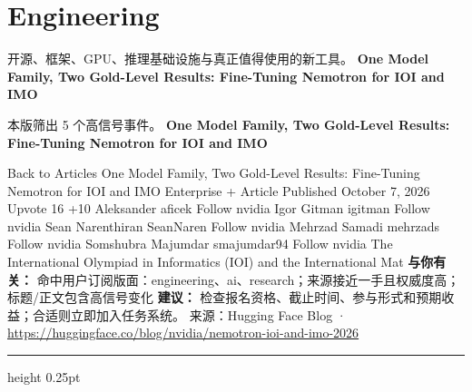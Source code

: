 \documentclass[10.5pt]{ctexart}
\begin{document}
\section*{Engineering}
{\color{ormuted} 开源、框架、GPU、推理基础设施与真正值得使用的新工具。}
\vspace{2mm}
{\LARGE\bfseries One Model Family, Two Gold-Level Results: Fine-Tuning Nemotron for IOI and IMO}\par
\vspace{1mm}
{\color{ormuted} 本版筛出 5 个高信号事件。}
\vspace{3mm}
{\Large\bfseries One Model Family, Two Gold-Level Results: Fine-Tuning Nemotron for IOI and IMO}\par
Back to Articles One Model Family, Two Gold-Level Results: Fine-Tuning Nemotron for IOI and IMO Enterprise + Article Published October 7, 2026 Upvote 16 +10 Aleksander aficek Follow nvidia Igor Gitman igitman Follow nvidia Sean Narenthiran SeanNaren Follow nvidia Mehrzad Samadi mehrzads Follow nvidia Somshubra Majumdar smajumdar94 Follow nvidia The International Olympiad in Informatics (IOI) and the International Mat
\textbf{与你有关：} 命中用户订阅版面：engineering、ai、research；来源接近一手且权威度高；标题/正文包含高信号变化
\textbf{建议：} 检查报名资格、截止时间、参与形式和预期收益；合适则立即加入任务系统。
{\footnotesize\color{ormuted} 来源：Hugging Face Blog · \url{https://huggingface.co/blog/nvidia/nemotron-ioi-and-imo-2026}}
\vspace{4mm}
\hrule height 0.25pt
\vspace{3mm}
\end{document}
